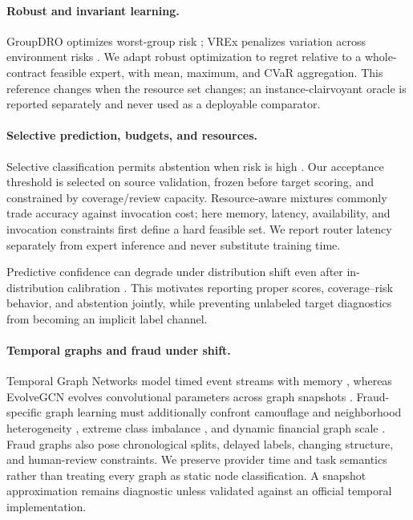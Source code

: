 \paragraph{Robust and invariant learning.}
GroupDRO optimizes worst-group risk \cite{sagawa2020groupdro}; VREx penalizes variation across environment risks \cite{krueger2021vrex}. We adapt robust optimization to regret relative to a whole-contract feasible expert, with mean, maximum, and CVaR aggregation. This reference changes when the resource set changes; an instance-clairvoyant oracle is reported separately and never used as a deployable comparator.

\paragraph{Selective prediction, budgets, and resources.}
Selective classification permits abstention when risk is high \cite{geifman2017selective}. Our acceptance threshold is selected on source validation, frozen before target scoring, and constrained by coverage/review capacity. Resource-aware mixtures commonly trade accuracy against invocation cost; here memory, latency, availability, and invocation constraints first define a hard feasible set. We report router latency separately from expert inference and never substitute training time.

Predictive confidence can degrade under distribution shift even after in-distribution calibration \cite{ovadia2019uncertainty}. This motivates reporting proper scores, coverage--risk behavior, and abstention jointly, while preventing unlabeled target diagnostics from becoming an implicit label channel.

\paragraph{Temporal graphs and fraud under shift.}
Temporal Graph Networks model timed event streams with memory \cite{rossi2020tgn}, whereas EvolveGCN evolves convolutional parameters across graph snapshots \cite{pareja2020evolvegcn}. Fraud-specific graph learning must additionally confront camouflage and neighborhood heterogeneity \cite{dou2020caregnn}, extreme class imbalance \cite{liu2021pcgnn}, and dynamic financial graph scale \cite{huang2022dgraph}. Fraud graphs also pose chronological splits, delayed labels, changing structure, and human-review constraints. We preserve provider time and task semantics rather than treating every graph as static node classification. A snapshot approximation remains diagnostic unless validated against an official temporal implementation.


